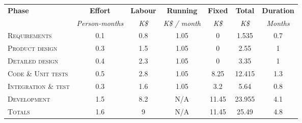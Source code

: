 \begin{tabular}{l|ccccc|c}
\multirow{2}{*}{\textbf{Phase}} & \textbf{Effort} & \textbf{Labour} & \textbf{Running} & \textbf{Fixed} & \textbf{Total} & \textbf{Duration} \\
& \textit{Person-months} & \textit{K\$} & \textit{K\$ / month} & \textit{K\$} & \textit{K\$} & \textit{Months} \\
\textsc{Requirements} & 0.1 & 0.8 & 1.05 & 0 & 1.535 & 0.7 \\
\textsc{Product design} & 0.3 & 1.5 & 1.05 & 0 & 2.55 & 1 \\
\textsc{Detailed design} & 0.4 & 2.3 & 1.05 & 0 & 3.35 & 1 \\
\textsc{Code \& Unit tests} & 0.5 & 2.8 & 1.05 & 8.25 & 12.415 & 1.3 \\
\textsc{Integration \& test} & 0.3 & 1.6 & 1.05 & 3.2 & 5.64 & 0.8 \\ \hline
\textsc{Development} & 1.5 & 8.2 & N/A & 11.45 & 23.955 & 4.1 \\
\textsc{Totals} & 1.6 & 9 & N/A & 11.45 & 25.49 & 4.8
\end{tabular}
